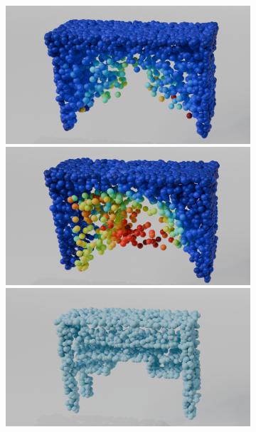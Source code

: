 \begin{figure}[htb]
\begin{subfigure}[t]{\textwidth+20pt\relax}
        \includegraphics[width=\dimexpr\linewidth-20pt\relax]{figures/ens_lin_t1.png}
        \includegraphics[width=\dimexpr\linewidth-20pt\relax]{figures/iml_lin_t1.png}
        \includegraphics[width=\dimexpr\linewidth-20pt\relax]{figures/com_t1.png}

\end{subfigure}
\end{figure}
